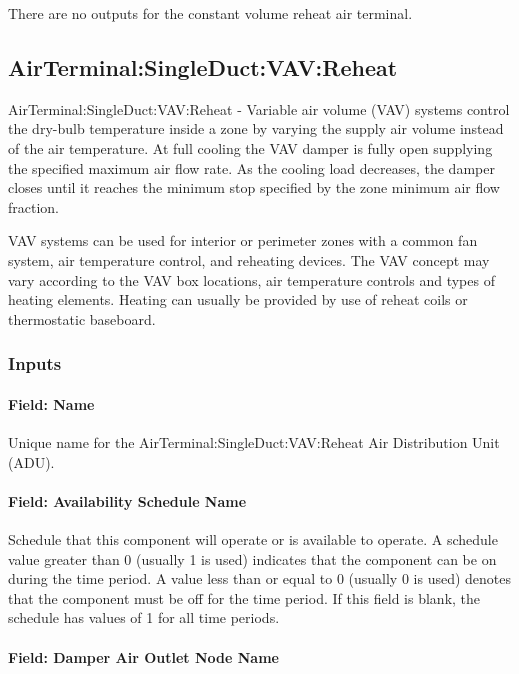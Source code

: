 There are no outputs for the constant volume reheat air terminal.

\subsection{AirTerminal:SingleDuct:VAV:Reheat}\label{airterminalsingleductvavreheat}

AirTerminal:SingleDuct:VAV:Reheat - Variable air volume (VAV) systems control the dry-bulb temperature inside a zone by varying the supply air volume instead of the air temperature. At full cooling the VAV damper is fully open supplying the specified maximum air flow rate. As the cooling load decreases, the damper closes until it reaches the minimum stop specified by the zone minimum air flow fraction.

VAV systems can be used for interior or perimeter zones with a common fan system, air temperature control, and reheating devices. The VAV concept may vary according to the VAV box locations, air temperature controls and types of heating elements. Heating can usually be provided by use of reheat coils or thermostatic baseboard.

\subsubsection{Inputs}\label{inputs-2-001}

\paragraph{Field: Name}\label{field-name-2-000}

Unique name for the AirTerminal:SingleDuct:VAV:Reheat Air Distribution Unit (ADU).

\paragraph{Field: Availability Schedule Name}\label{field-availability-schedule-name-2}

Schedule that this component will operate or is available to operate. A schedule value greater than 0 (usually 1 is used) indicates that the component can be on during the time period. A value less than or equal to 0 (usually 0 is used) denotes that the component must be off for the time period. If this field is blank, the schedule has values of 1 for all time periods.

\paragraph{Field: Damper Air Outlet Node Name}\label{field-damper-air-outlet-node-name}

